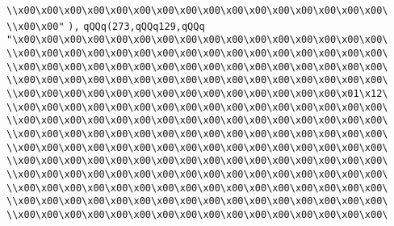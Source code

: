 \verb|\\x00\x00\x00\x00\x00\x00\x00\x00\x00\x00\x00\x00\x00\x00\x00\x00\|\newline
\verb|\\x00\x00"|\newline
\verb|),|\newline
\verb|qQQq(273,qQQq129,qQQq|\newline
\verb|"\x00\x00\x00\x00\x00\x00\x00\x00\x00\x00\x00\x00\x00\x00\x00\x00\|\newline
\verb|\\x00\x00\x00\x00\x00\x00\x00\x00\x00\x00\x00\x00\x00\x00\x00\x00\|\newline
\verb|\\x00\x00\x00\x00\x00\x00\x00\x00\x00\x00\x00\x00\x00\x00\x00\x00\|\newline
\verb|\\x00\x00\x00\x00\x00\x00\x00\x00\x00\x00\x00\x00\x00\x00\x00\x00\|\newline
\verb|\\x00\x00\x00\x00\x00\x00\x00\x00\x00\x00\x00\x00\x00\x00\x01\x12\|\newline
\verb|\\x00\x00\x00\x00\x00\x00\x00\x00\x00\x00\x00\x00\x00\x00\x00\x00\|\newline
\verb|\\x00\x00\x00\x00\x00\x00\x00\x00\x00\x00\x00\x00\x00\x00\x00\x00\|\newline
\verb|\\x00\x00\x00\x00\x00\x00\x00\x00\x00\x00\x00\x00\x00\x00\x00\x00\|\newline
\verb|\\x00\x00\x00\x00\x00\x00\x00\x00\x00\x00\x00\x00\x00\x00\x00\x00\|\newline
\verb|\\x00\x00\x00\x00\x00\x00\x00\x00\x00\x00\x00\x00\x00\x00\x00\x00\|\newline
\verb|\\x00\x00\x00\x00\x00\x00\x00\x00\x00\x00\x00\x00\x00\x00\x00\x00\|\newline
\verb|\\x00\x00\x00\x00\x00\x00\x00\x00\x00\x00\x00\x00\x00\x00\x00\x00\|\newline
\verb|\\x00\x00\x00\x00\x00\x00\x00\x00\x00\x00\x00\x00\x00\x00\x00\x00\|\newline
\verb|\\x00\x00\x00\x00\x00\x00\x00\x00\x00\x00\x00\x00\x00\x00\x00\x00\|\newline
